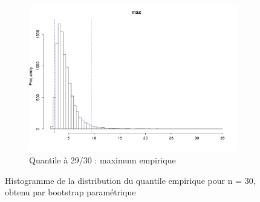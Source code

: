 \documentclass{article}
\renewcommand*{\(}{ \left( }
\renewcommand*{\)}{ \right) }
\begin{document}
\begin{figure}[H]
\begin{subfigure}[t]{0.3\textwidth}
    \end{subfigure}%
    \begin{subfigure}[t]{0.3\textwidth}
        \includegraphics[width = \linewidth]{img/BootstrapParamEMV-Max-30.pdf}
        \caption{Quantile à 29/30 : maximum empirique}
        \label{fig:BPEMVMax}
    \end{subfigure}%
    \caption{Histogramme de la distribution du quantile empirique pour n = 30, obtenu par bootstrap paramétrique}
    \label{fig:BPEMV}
\end{figure}
\end{document}
